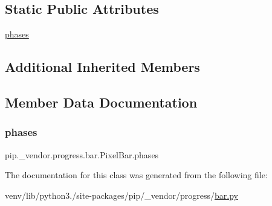 \subsection*{Static Public Attributes}
\begin{DoxyCompactItemize}
\item 
\hyperlink{classpip_1_1__vendor_1_1progress_1_1bar_1_1PixelBar_a42b1aa62b65255ccffe6676a69e5350e}{phases}
\end{DoxyCompactItemize}
\subsection*{Additional Inherited Members}


\subsection{Member Data Documentation}
\mbox{\label{classpip_1_1__vendor_1_1progress_1_1bar_1_1PixelBar_a42b1aa62b65255ccffe6676a69e5350e}} 
\subsubsection{\texorpdfstring{phases}{phases}}
{\footnotesize\ttfamily pip.\+\_\+vendor.\+progress.\+bar.\+Pixel\+Bar.\+phases\hspace{0.3cm}{\ttfamily [static]}}



The documentation for this class was generated from the following file\+:\begin{DoxyCompactItemize}
\item 
venv/lib/python3./site-\/packages/pip/\+\_\+vendor/progress/\hyperlink{bar_8py}{bar.\+py}\end{DoxyCompactItemize}
